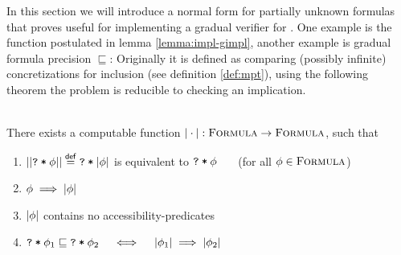 In this section we will introduce a normal form for partially unknown formulas that proves useful for implementing a gradual verifier for \gvlidf.
One example is the function postulated in lemma \ref{lemma:impl-gimpl}, another example is gradual formula precision $\sqsubseteq$:
Originally it is defined as comparing (possibly infinite) concretizations for inclusion (see definition \ref{def:mpt}), using the following theorem the problem is reducible to checking an implication.

\begin{theorem}\label{thm:gnf}~\\
    There exists a computable function $|\cdot| : \textup{\textsc{Formula}} \rightarrow \textup{\textsc{Formula}}$, such that
    \begin{enumerate}
        \item $||\textup{\texttt{\textup{\texttt{?}}\:*\:\ensuremath{\phi}}}|| \overset{\textup{\textmd{\textsf{def}}}}{=} \textup{\texttt{\textup{\texttt{?}}\:*\:\ensuremath{|\phi|}}}$ is equivalent to $\textup{\texttt{\textup{\texttt{?}}\:*\:\ensuremath{\phi}}}$ ~~~(for all $\phi \in \textup{\textsc{Formula}}$)
        \item $\phi \implies |\phi|$
        \item $|\phi|$ contains no accessibility-predicates
        \item $\textup{\texttt{\textup{\texttt{?}}\:*\:\ensuremath{\phi_1}}} \sqsubseteq \textup{\texttt{\textup{\texttt{?}}\:*\:\ensuremath{\phi_2}}}  \quad\iff\quad  |\phi_1| \implies |\phi_2|$
    \end{enumerate}
\end{theorem}

